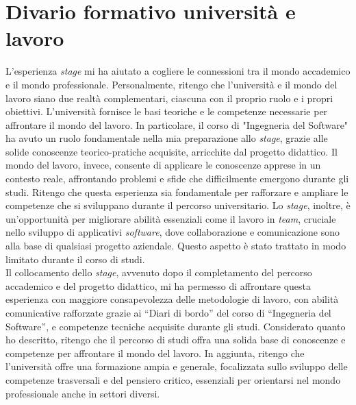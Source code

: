 \section{Divario formativo università e lavoro}
L'esperienza \textit{stage} mi ha aiutato a cogliere le connessioni tra il mondo accademico e il mondo professionale. Personalmente, ritengo che l'università e il mondo del lavoro siano due realtà complementari, ciascuna con il proprio ruolo e i propri obiettivi. L'università fornisce le basi teoriche e le competenze necessarie per affrontare il mondo del lavoro. In particolare, il corso di "Ingegneria del Software" ha avuto un ruolo fondamentale nella mia preparazione allo \textit{stage}, grazie alle solide conoscenze teorico-pratiche acquisite, arricchite dal progetto didattico.
Il mondo del lavoro, invece, consente di applicare le conoscenze apprese in un contesto reale, affrontando problemi e sfide che difficilmente emergono durante gli studi. Ritengo che questa esperienza sia fondamentale per rafforzare e ampliare le competenze che si sviluppano durante il percorso universitario.
Lo \textit{stage}, inoltre, è un’opportunità per migliorare abilità essenziali come il lavoro in \textit{team}, cruciale nello sviluppo di applicativi \textit{software}, dove collaborazione e comunicazione sono alla base di qualsiasi progetto aziendale. Questo aspetto è stato trattato in modo limitato durante il corso di studi. \\ 
Il collocamento dello \textit{stage}, avvenuto dopo il completamento del percorso accademico e del progetto didattico, mi ha permesso di affrontare questa esperienza con maggiore consapevolezza delle metodologie di lavoro, con abilità comunicative rafforzate grazie ai “Diari di bordo” del corso di “Ingegneria del Software”, e competenze tecniche acquisite durante gli studi.
Considerato quanto ho descritto, ritengo che il percorso di studi offra una solida base di conoscenze e competenze per affrontare il mondo del lavoro. In aggiunta, ritengo che l'università offre una formazione ampia e generale, focalizzata sullo sviluppo delle competenze trasversali e del pensiero critico, essenziali per orientarsi nel mondo professionale anche in settori diversi.
